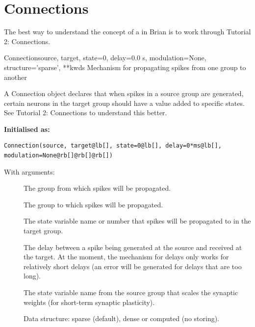 \documentclass[letterpaper,10pt]{manual}
\begin{document}
\resetcurrentobjects


\section{Connections}

The best way to understand the concept of a \hyperlink{brian.Connection}{} in
Brian is to work through Tutorial 2: Connections.


\hypertarget{brian.Connection}{}\begin{classdesc}{Connection}{source, target, state=0, delay=0.0 s, modulation=None, structure='sparse', **kwds}
Mechanism for propagating spikes from one group to another

A Connection object declares that when spikes in a source
group are generated, certain neurons in the target group
should have a value added to specific states. See
Tutorial 2: Connections to understand this better.

\textbf{Initialised as:}

\begin{Verbatim}[commandchars=@\[\]]
Connection(source, target@lb[], state=0@lb[], delay=0*ms@lb[], modulation=None@rb[]@rb[]@rb[])
\end{Verbatim}

With arguments:
\begin{description}
\item[]
The group from which spikes will be propagated.

\item[]
The group to which spikes will be propagated.

\item[]
The state variable name or number that spikes will be
propagated to in the target group.

\item[]
The delay between a spike being generated at the source
and received at the target. At the moment, the mechanism
for delays only works for relatively short delays (an
error will be generated for delays that are too long).

\item[]
The state variable name from the source group that scales
the synaptic weights (for short-term synaptic plasticity).

\item[]
Data structure: sparse (default), dense or computed (no storing).


\end{description}
\end{classdesc}
\end{document}

